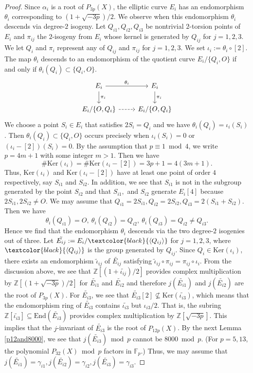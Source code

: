 \documentclass[a4paper, 11pt]{article}
\theoremstyle{plain}
\newcommand{\?}{\textcolor{red}{??}}
\newcommand{\fp}{\mathbb{F}_p}
\newcommand{\bZ}{\mathbb{Z}}
\begin{document}
\begin{proof}
Since $\alpha_i$ is a root of $P_{3p}(X)$, the elliptic curve $E_i$ has an endomorphism $\theta_i$ corresponding to $(1+\sqrt{-3p})/2$. We observe when this endomorphism $\theta_i$ descends via degree-$2$ isogeny. Let $Q_{i1},Q_{i2},Q_{i3}$ be nontrivial $2$-torsion points of $E_i$ and $\pi_{ij}$ the $2$-isogeny from $E_i$ whose kernel is generated by $Q_{ij}$ for $j=1,2,3$. We let $Q_{i}$ and $\pi_i$ represent any of $Q_{ij}$ and $\pi_{ij}$ for $j=1,2,3$.  We set $\iota_i:=\theta_i\circ [2]$.  The map $\theta_i$ descends to an endomorphism of the quotient curve $E_i/\{Q_i,O\}$ if and only if $\theta_i(Q_i)\subset\{Q_i,O\}$. 
\[
\begin{tikzcd}
 E_{i} \arrow[r, "\theta_i"] \arrow[d,"\pi_{i}"] & E_{i} \arrow[d,"\pi_{i}"] \\
E_{i} / \{O,Q_i\} \arrow[r, dashed]&E_{i} / \{O,Q_i\}
\end{tikzcd}
\]
We choose a point $S_i\in E_i$ that satisfies $2S_i=Q_i$ and we have $\theta_i(Q_i)=\iota_i( S_i)$.  Then $\theta_i(Q_i)\subset\{Q_i,O\}$ occurs precisely when $\iota_i (S_i)=0$ or $(\iota_i-[2])(S_i)=0$. By the assumption that $p \equiv1 \bmod 4$, we write $p=4m+1$ with some integer $m >1$. Then we have 
\[
\#\textrm{Ker}(\iota_i)=\#\textrm{Ker}(\iota_i-[2])=3p+1=4(3m+1).
\]
Thus, $\textrm{Ker}(\iota_i)$ and $\textrm{Ker}(\iota_i-[2])$ have at least one point of order $4$ respectively, say $S_{i1}$ and $S_{i2}$. In addition, we see that $S_{i1}$ is not in the subgroup generated by the point $S_{i2}$ and that $S_{i1},$ and $S_{i2}$ generate $E_i[4]$ because $2S_{i1},2S_{i2}\ne O$. We may assume that $Q_{i1}=2S_{i1},Q_{i2}=2S_{i2}, Q_{i3}=2(S_{i1}+S_{i2})$. Then we have 
\[
\theta_i(Q_{i1})=O,\ \theta_i(Q_{i2})=Q_{i2},\  \theta_i(Q_{i3})=Q_{i2}\ne Q_{i3}.
\]
Hence we find that the endomorphism $\theta_i$ descends via the two degree-$2$ isogenies out of three. Let $\tilde{E_{ij}}:=E_i/\textcolor{black}{\langle Q_{ij}\rangle}$ for $j=1,2,3$, where $\textcolor{black}{\langle Q_{ij}\rangle}$ is the group generated by $Q_{ij}$. Since $Q_{i}\in \textrm{Ker}(\iota_i)$, there exists an endomorphism $\tilde{\iota}_{ij}$ of $\tilde{E_{ij}}$ satisfying $\tilde{\iota}_{ij}\circ \pi_{ij}=\pi_{ij} \circ \iota_i$. From the discussion above, we see that $\bZ[(1+\tilde{\iota_{ij}})/2]$ provides complex multiplication by $\bZ[(1+\sqrt{-3p})/2]$ for $\tilde{E_{i1}}$ and $\tilde{E_{i2}}$ and therefore $j(\tilde{E_{i1}})$ and $j(\tilde{E_{i2}})$ are the root of $P_{3p}(X)$. For $\tilde{E_{i3}}$, we see that $\tilde{E_{i3}}[2] \nsubseteq \textrm{Ker}(\tilde{\iota_{i3}})$, which means that the endomorphism ring of $\tilde{E_{i3}}$ contains $\tilde{\iota_{i3}}$ but $\iota_{i3}/2$.  That is, the subring $\bZ[\tilde{\iota_{i3}}]\subseteq \textrm{End}(\tilde{E_{i3}})$ provides complex multiplication by $\bZ[\sqrt{-3p}]$.  This implies that the $j$-invariant of $\tilde{E_{i3}}$ is the root of $P_{12p}(X)$. By the next Lemma \ref{p12and8000}, we see that $j(\tilde{E_{i3}}) \bmod p$ cannot be $8000 \bmod p$. (For $p=5,13$, the polynomial $P_{32}(X) \bmod p$ factors in $\fp$.) Thus, we may assume that $j(\tilde{E_{i1}})=\gamma_{i1},j(\tilde{E_{i2}})=\gamma_{i2},j(\tilde{E_{i3}})=\gamma_{i3}$.  


\end{proof}
\end{document}
